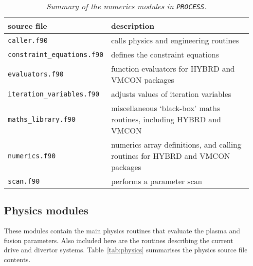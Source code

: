 \documentclass[11pt,a4paper]{report}
\newcommand{\process}{\mbox{\texttt{PROCESS}}}
\begin{document}
\begin{table}[tbph]
\footnotesize
\begin{center}
\begin{tabular}{||l||l||} \hline
source file   & description \\ \hline
\texttt{caller.f90} & calls physics and engineering routines \\
\texttt{constraint\_equations.f90} & defines the constraint equations \\
\texttt{evaluators.f90} & function evaluators for HYBRD and VMCON packages \\
\texttt{iteration\_variables.f90} & adjusts values of iteration variables \\
\texttt{maths\_library.f90} & miscellaneous `black-box' maths routines,
including HYBRD and VMCON \\
\texttt{numerics.f90} & numerics array definitions, and calling routines for
HYBRD and VMCON packages \\
\texttt{scan.f90} & performs a parameter scan \\
\hline
\end{tabular}
\end{center}
\caption[Summary of numerics modules]
{\label{tab:numerics}
  \textit{Summary of the numerics modules in \process.}
}
\end{table}

\subsection{Physics modules}

These modules contain the main physics routines that evaluate the plasma and
fusion parameters. Also included here are the routines describing the current
drive and divertor systems. Table~\ref{tab:physics} summarises the physics
source file contents.
\end{document}
